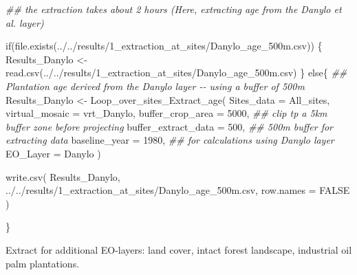 \documentclass[
  letterpaper,
  DIV=11,
  numbers=noendperiod]{scrartcl}
\newenvironment{Shaded}{\begin{snugshade}}{\end{snugshade}}
\newcommand{\AttributeTok}[1]{\textcolor[rgb]{0.40,0.45,0.13}{#1}}
\newcommand{\ConstantTok}[1]{\textcolor[rgb]{0.56,0.35,0.01}{#1}}
\newcommand{\ControlFlowTok}[1]{\textcolor[rgb]{0.00,0.23,0.31}{#1}}
\newcommand{\DecValTok}[1]{\textcolor[rgb]{0.68,0.00,0.00}{#1}}
\newcommand{\DocumentationTok}[1]{\textcolor[rgb]{0.37,0.37,0.37}{\textit{#1}}}
\newcommand{\FunctionTok}[1]{\textcolor[rgb]{0.28,0.35,0.67}{#1}}
\newcommand{\NormalTok}[1]{\textcolor[rgb]{0.00,0.23,0.31}{#1}}
\newcommand{\OtherTok}[1]{\textcolor[rgb]{0.00,0.23,0.31}{#1}}
\newcommand{\StringTok}[1]{\textcolor[rgb]{0.13,0.47,0.30}{#1}}
\begin{document}
\begin{Shaded}
\begin{Highlighting}[]
\DocumentationTok{\#\# the extraction takes about 2 hours (Here, extracting age from the Danylo et al. layer)}

\ControlFlowTok{if}\NormalTok{(}\FunctionTok{file.exists}\NormalTok{(}\StringTok{\textquotesingle{}../../results/1\_extraction\_at\_sites/Danylo\_age\_500m.csv\textquotesingle{}}\NormalTok{)) \{}
\NormalTok{  Results\_Danylo }\OtherTok{\textless{}{-}}
    \FunctionTok{read.csv}\NormalTok{(}\StringTok{\textquotesingle{}../../results/1\_extraction\_at\_sites/Danylo\_age\_500m.csv\textquotesingle{}}\NormalTok{)}
\NormalTok{\} }\ControlFlowTok{else}\NormalTok{\{}
  \DocumentationTok{\#\# Plantation age derived from the Danylo layer {-}{-} using a buffer of 500m}
\NormalTok{  Results\_Danylo }\OtherTok{\textless{}{-}}
    \FunctionTok{Loop\_over\_sites\_Extract\_age}\NormalTok{(}
      \AttributeTok{Sites\_data =}\NormalTok{ All\_sites,}
      \AttributeTok{virtual\_mosaic =}\NormalTok{ vrt\_Danylo,}
      \AttributeTok{buffer\_crop\_area =} \DecValTok{5000}\NormalTok{, }\DocumentationTok{\#\# clip tp a 5km buffer zone before projecting}
      \AttributeTok{buffer\_extract\_data =} \DecValTok{500}\NormalTok{, }\DocumentationTok{\#\# 500m buffer for extracting data}
      \AttributeTok{baseline\_year =} \DecValTok{1980}\NormalTok{, }\DocumentationTok{\#\# for calculations using Danylo layer}
      \AttributeTok{EO\_Layer =} \StringTok{\textquotesingle{}Danylo\textquotesingle{}}
\NormalTok{    )}
  
  \FunctionTok{write.csv}\NormalTok{(}
\NormalTok{    Results\_Danylo,}
    \StringTok{\textquotesingle{}../../results/1\_extraction\_at\_sites/Danylo\_age\_500m.csv\textquotesingle{}}\NormalTok{,}
    \AttributeTok{row.names =} \ConstantTok{FALSE}
\NormalTok{  )}
  
\NormalTok{\}}
\end{Highlighting}
\end{Shaded}

Extract for additional EO-layers: land cover, intact forest landscape,
industrial oil palm plantations.
\end{document}
